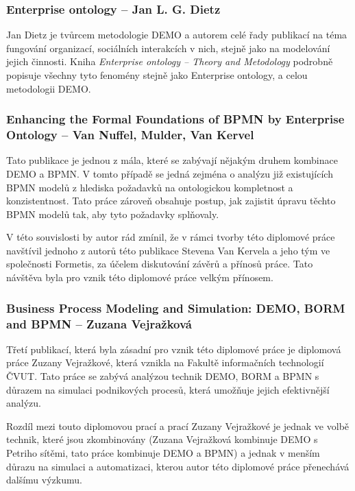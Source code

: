 \subsubsection{Enterprise ontology – Jan L. G. Dietz}
Jan Dietz je tvůrcem metodologie DEMO a autorem celé řady publikací na téma fungování organizací, sociálních interakcích v nich, stejně jako na modelování jejich činnosti. Kniha \textit{Enterprise ontology – Theory and Metodology} podrobně popisuje všechny tyto fenomény stejně jako Enterprise ontology, \ptheory a celou metodologii DEMO.

\subsubsection{Enhancing the Formal Foundations of BPMN by Enterprise Ontology – Van Nuffel, Mulder, Van Kervel}
Tato publikace je jednou z mála, které se zabývají nějakým druhem kombinace DEMO a BPMN. V tomto případě se jedná zejména o analýzu již existujících BPMN modelů z hlediska požadavků na ontologickou kompletnost a konzistentnost. Tato práce zároveň obsahuje postup, jak zajistit úpravu těchto BPMN modelů tak, aby tyto požadavky splňovaly.

V této souvislosti by autor rád zmínil, že v rámci tvorby této diplomové práce navštívil jednoho z autorů této publikace Stevena Van Kervela a jeho tým ve společnosti Formetis, za účelem diskutování závěrů a přínosů práce. Tato návštěva byla pro vznik této diplomové práce velkým přínosem.

\subsubsection{Business Process Modeling and Simulation: DEMO, BORM and BPMN – Zuzana Vejražková}
Třetí publikací, která byla zásadní pro vznik této diplomové práce je diplomová práce Zuzany Vejražkové, která vznikla na Fakultě informačních technologií ČVUT. Tato práce se zabývá analýzou technik DEMO, BORM a BPMN s důrazem na simulaci podnikových procesů, která umožňuje jejich efektivnější analýzu.

Rozdíl mezi touto diplomovou prací a prací Zuzany Vejražkové je jednak ve volbě technik, které jsou zkombinovány (Zuzana Vejražková kombinuje DEMO s Petriho sítěmi, tato práce kombinuje DEMO a BPMN) a jednak v menším důrazu na simulaci a automatizaci, kterou autor této diplomové práce přenechává dalšímu výzkumu.